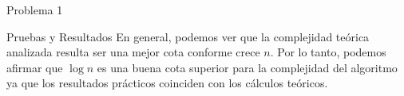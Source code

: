 \begin{section}{Problema 1}
\begin{subsection}{Pruebas y Resultados}
		En general, podemos ver que la complejidad teórica analizada resulta ser una mejor cota conforme crece $n$. Por lo tanto, podemos afirmar que $\log n$ es una buena cota superior para la complejidad del algoritmo ya que los resultados prácticos coinciden con los cálculos teóricos.
	\end{subsection}

\end{section}

